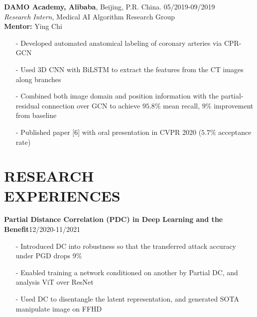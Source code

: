 \documentclass[margin]{res}
\begin{document}
\begin{resume}
                \vspace{-1em}  
                
                \textbf{DAMO Academy, Alibaba}, Beijing, P.R. China. \hfill 05/2019-09/2019\\
                {\it Research Intern}, Medical AI Algorithm Research Group\\
                \textbf{Mentor:} Ying Chi
                \begin{itemize}\itemsep -2.2pt %
                 \item[-] Developed automated anatomical labeling of coronary arteries via CPR-GCN
                 \item[-] Used 3D CNN with BiLSTM to extract the features from the CT images along branches
                 \item[-] Combined both image domain and position information with the partial-residual connection over GCN to achieve $95.8\%$ mean recall, $9\%$ improvement from baseline
                 \item[-] Published paper [6] with oral presentation in CVPR 2020 ($5.7\%$ acceptance rate)
                 \end{itemize}

\vspace{-1em}
\section{RESEARCH \\ EXPERIENCES}
				\textbf{Partial Distance Correlation (PDC) in Deep Learning and the Benefit}\hfill 12/2020-11/2021
                \begin{itemize}\itemsep -2.2pt %
                 \item[-] Introduced DC into robustness so that the transferred attack accuracy under PGD drops 9\%
                 \item[-] Enabled training a network conditioned on another by Partial DC, and analysis ViT over ResNet
                 \item[-] Used DC to disentangle the latent representation, and generated SOTA manipulate image on FFHD
                 \end{itemize}


\end{resume}
\end{document}
